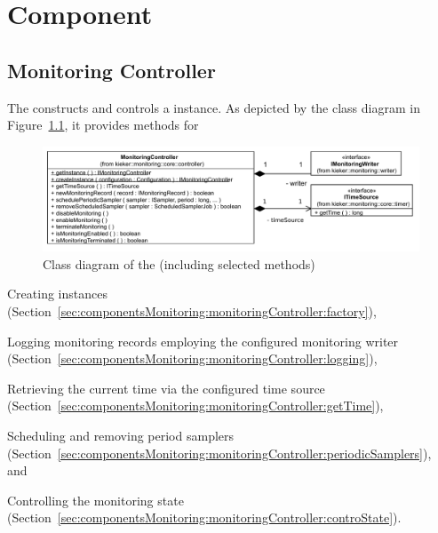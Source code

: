 % 


\chapter{\KiekerMonitoringPart{} Component}\label{chap:componentsMonitoring}


\section{Monitoring Controller}\label{sec:componentsMonitoring:monitoringController}

The  constructs and controls a \KiekerMonitoringPart{} %
instance. As depicted by the class diagram in Figure~\ref{fig:monitoringController:classdiagram}, it provides methods for\\

\enlargethispage{1cm}

\begin{figure}\centering %
\includegraphics[scale=0.7]{images/kieker_monitoringControlleruserguide-simplified}
\caption{Class diagram of the  (including selected methods)}
\label{fig:monitoringController:classdiagram}
\end{figure}

\begin{compactitem}
 \item Creating  instances (Section~\ref{sec:componentsMonitoring:monitoringController:factory}),
 \item Logging monitoring records employing the configured monitoring writer (Section~\ref{sec:componentsMonitoring:monitoringController:logging}), 
 \item Retrieving the current time via the configured time source (Section~\ref{sec:componentsMonitoring:monitoringController:getTime}),
 \item Scheduling and removing period samplers (Section~\ref{sec:componentsMonitoring:monitoringController:periodicSamplers}), and
 \item Controlling the monitoring state (Section~\ref{sec:componentsMonitoring:monitoringController:controState}).
\end{compactitem}

